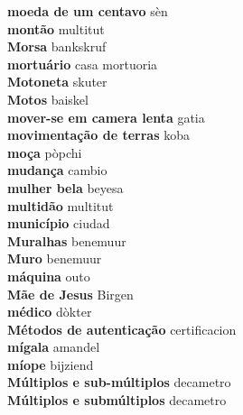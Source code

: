 \textbf{ moeda de um centavo  } sèn \\
\textbf{ montão  } multitut \\
\textbf{ Morsa  } bankskruf \\
\textbf{ mortuário  } casa mortuoria \\
\textbf{ Motoneta  } skuter \\
\textbf{ Motos  } baiskel \\
\textbf{ mover-se em camera lenta  } gatia \\
\textbf{ movimentação de terras  } koba \\
\textbf{ moça  } pòpchi \\
\textbf{ mudança  } cambio \\
\textbf{ mulher bela  } beyesa \\
\textbf{ multidão  } multitut \\
\textbf{ município  } ciudad \\
\textbf{ Muralhas  } benemuur \\
\textbf{ Muro  } benemuur \\
\textbf{ máquina  } outo \\
\textbf{ Mãe de Jesus  } Birgen \\
\textbf{ médico  } dòkter \\
\textbf{ Métodos de autenticação  } certificacion \\
\textbf{ mígala  } amandel \\
\textbf{ míope  } bijziend \\
\textbf{ Múltiplos e sub-múltiplos  } decametro \\
\textbf{ Múltiplos e submúltiplos  } decametro \\
